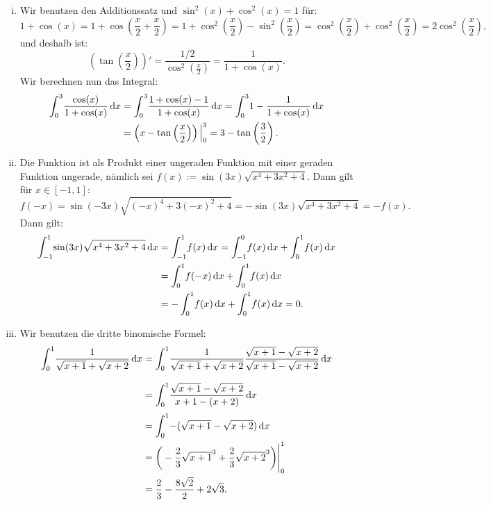 \documentclass[a4paper, 20]{exam}
\begin{document}
\begin{solution}
\begin{enumerate}[i.)]
\item
Wir benutzen den Additionssatz und $\sin^2(x)+\cos^2(x)=1$ für:
$$1+\cos(x) = 1+\cos\left(\frac{x}{2}+\frac{x}{2}\right) = 1+\cos^2\left(\frac{x}{2} \right) - \sin^2\left(\frac{x}{2} \right)= \cos^2\left(\frac{x}{2} \right)+\cos^2\left(\frac{x}{2} \right) = 2\cos^2\left(\frac{x}{2} \right),$$
und deshalb ist:
$$\left(\tan\left(\frac{x}{2} \right) \right)' = \frac{1/2}{\cos^2\left(\frac{x}{2} \right)} = \frac{1}{1+\cos(x)}.$$
Wir berechnen nun das Integral:
\begin{equation}
\begin{aligned}
\int_0^3 \! \frac{\cos(x)}{1+\cos(x)} \, \mathrm{d}x 
&=\int_0^3 \! \frac{1+\cos(x)-1}{1+\cos(x)} \, \mathrm{d}x 
= \int_0^3 \! 1-\frac{1}{1+\cos(x)} \, \mathrm{d}x\\
&= \left( x-\tan\left(\frac{x}{2}\right) \right)\Big|^3_0
=3-\tan\left(\frac{3}{2}\right). 
\notag
\end{aligned}
\end{equation}

\item
Die Funktion ist als Produkt einer ungeraden Funktion mit einer geraden Funktion ungerade, nämlich sei $f(x):={\sin(3x)}\sqrt{x^4+3x^2+4}$. Dann gilt für $x \in [-1,1]$:
$$f(-x)={\sin(-3x)}\sqrt{(-x)^4+3(-x)^2+4} = -{\sin(3x)}\sqrt{x^4+3x^2+4} = -f(x).$$
Dann gilt:
\begin{equation}
\begin{aligned}
\int_{-1}^1 \! {\sin(3x)}\sqrt{x^4+3x^2+4} \, \mathrm{d}x
 &= \int_{-1}^1 \! f(x) \, \mathrm{d}x 
= \int_{-1}^0 \! f(x) \, \mathrm{d}x+\int_{0}^1 \! f(x) \, \mathrm{d}x\\
&=\int_{0}^1 \! f(-x) \, \mathrm{d}x+\int_{0}^1 \! f(x) \, \mathrm{d}x\\
&=-\int_{0}^1 \! f(x) \, \mathrm{d}x+\int_{0}^1 \! f(x) \, \mathrm{d}x = 0.
\notag
\end{aligned}
\end{equation}

\item
Wir benutzen die dritte binomische Formel:
\begin{equation}
\begin{aligned}
\int_0^1 \! \frac{1}{\sqrt{x+1}+ \sqrt{x+2}} \, \mathrm{d}x
&= \int_0^1 \! \frac{1}{\sqrt{x+1}+ \sqrt{x+2}}\frac{\sqrt{x+1}- \sqrt{x+2}}{\sqrt{x+1}- \sqrt{x+2}} \, \mathrm{d}x\\[.3cm]
&= \int_0^1 \! \frac{\sqrt{x+1}- \sqrt{x+2}}{x+1- (x+2)} \, \mathrm{d}x\\[.1cm]
&=\int_0^1 \! -(\sqrt{x+1}- \sqrt{x+2})\, \mathrm{d}x\\
&= \bigg( -\frac{2}{3} \sqrt{x+1}^3 + \frac{2}{3}\sqrt{x+2}^3 \bigg) \Bigg|^1_0\\
&= \frac{2}{3}- \frac{8\sqrt{2}}{2}+2\sqrt{3}. 
\notag
\end{aligned}
\end{equation}


\end{enumerate}
\end{solution}
\end{document}
